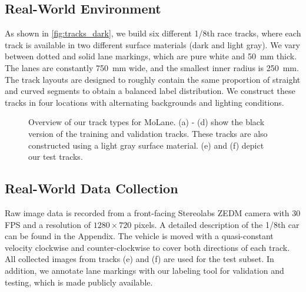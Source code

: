 \documentclass{article}
\begin{document}
	\subsection{Real-World Environment}
	As shown in \autoref{fig:tracks_dark}, we build six different 1/8th race tracks, where each track is available in two different surface materials (dark and light gray). We vary between dotted and solid lane markings, which are pure white and \SI{50}{\milli\metre} thick. The lanes are constantly \SI{750}{\milli\metre} wide, and the smallest inner radius is \SI{250}{\milli\metre}. The track layouts are designed to roughly contain the same proportion of straight and curved segments to obtain a balanced label distribution. We construct these tracks in four locations with alternating backgrounds and lighting conditions. 
	
	\begin{figure}
		\centering
		\hspace*{0.1cm}
		\hspace*{-1.7cm}
		\hspace*{0.1cm}
		\hspace*{0.1cm}
		\caption{Overview of our track types for MoLane. (a) - (d) show the black version of the training and validation tracks. These tracks are also constructed using a light gray surface material. (e) and (f) depict our test tracks.}
		\label{fig:tracks_dark}
	\end{figure}
	
	\subsection{Real-World Data Collection}
	Raw image data is recorded from a front-facing Stereolabs ZEDM camera with 30 FPS and a resolution of $1280 \times 720$ pixels. A detailed description of the 1/8th car can be found in the Appendix. The vehicle is moved with a quasi-constant velocity clockwise and counter-clockwise to cover both directions of each track. All collected images from tracks (e) and (f) are used for the test subset. In addition, we annotate lane markings with our labeling tool for validation and testing, which is made publicly available.
	
\end{document}
